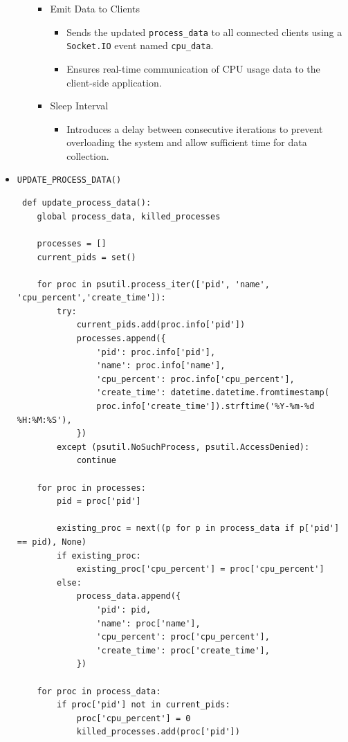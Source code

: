 \documentclass[12pt]{article}
\begin{document}
\begin{itemize}
\begin{itemize}
\begin{itemize}
\item {Emit Data to Clients}
\begin{itemize}
    \item Sends the updated \texttt{process\_data} to all connected clients using a \texttt{Socket.IO} event named \texttt{cpu\_data}.
    \item Ensures real-time communication of CPU usage data to the client-side application.
\end{itemize}

\item {Sleep Interval}
\begin{itemize}
    \item Introduces a delay between consecutive iterations to prevent overloading the system and allow sufficient time for data collection.
\end{itemize}
   \end{itemize}


\end{itemize}

\item \texttt{UPDATE\_PROCESS\_DATA()}
    \begin{verbatim}
 def update_process_data():
    global process_data, killed_processes
    
    processes = []
    current_pids = set()

    for proc in psutil.process_iter(['pid', 'name', 'cpu_percent','create_time']):
        try:
            current_pids.add(proc.info['pid'])
            processes.append({
                'pid': proc.info['pid'],
                'name': proc.info['name'],
                'cpu_percent': proc.info['cpu_percent'],
                'create_time': datetime.datetime.fromtimestamp(
                proc.info['create_time']).strftime('%Y-%m-%d %H:%M:%S'),
            })
        except (psutil.NoSuchProcess, psutil.AccessDenied):
            continue

    for proc in processes:
        pid = proc['pid']
        
        existing_proc = next((p for p in process_data if p['pid'] == pid), None)
        if existing_proc:
            existing_proc['cpu_percent'] = proc['cpu_percent']
        else:
            process_data.append({
                'pid': pid,
                'name': proc['name'],
                'cpu_percent': proc['cpu_percent'],
                'create_time': proc['create_time'],
            })

    for proc in process_data:
        if proc['pid'] not in current_pids:
            proc['cpu_percent'] = 0
            killed_processes.add(proc['pid'])


\end{verbatim}
\end{itemize}
\end{document}
